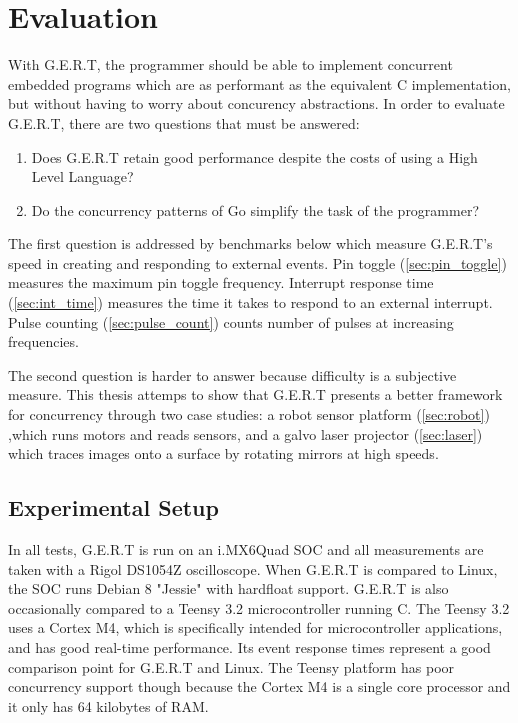 \chapter{Evaluation}

With G.E.R.T, the programmer should be able to implement concurrent embedded programs
which are as performant as the equivalent C implementation, but without having to
worry about concurency abstractions. In order to evaluate G.E.R.T, there are two questions
that must be answered:

\begin{enumerate}
  \item Does G.E.R.T retain good performance despite the costs of using a High Level Language?
  \item Do the concurrency patterns of Go simplify the task of the programmer?
\end{enumerate}

The first question is addressed by benchmarks below which measure G.E.R.T's
speed in creating and responding to external events. Pin toggle (\ref{sec:pin_toggle})
measures the maximum pin toggle frequency. Interrupt response time (\ref{sec:int_time})
measures the time it takes to respond to an external interrupt. Pulse counting
(\ref{sec:pulse_count}) counts number of pulses at increasing frequencies.

The second question is harder to answer because difficulty is a subjective
measure. This thesis attemps to show that G.E.R.T presents a better framework for
concurrency through two case studies: a robot sensor platform (\ref{sec:robot})
,which runs motors and reads sensors, and a galvo laser projector (\ref{sec:laser})
which traces images onto a surface by rotating mirrors at high speeds.

\section{Experimental Setup} \label{sec:setup}
In all tests, G.E.R.T is run on an i.MX6Quad SOC and all measurements are taken
with a Rigol DS1054Z oscilloscope. When G.E.R.T is compared to Linux, the SOC
runs Debian 8 "Jessie" with hardfloat support. G.E.R.T is also occasionally
compared to a Teensy 3.2 microcontroller running C. The Teensy 3.2 uses a Cortex M4, which is specifically
intended for microcontroller applications, and has good real-time performance. Its event
response times represent a good comparison point for G.E.R.T and Linux. The Teensy platform
has poor concurrency support though because the Cortex M4 is a single core processor
and it only has 64 kilobytes of RAM.



